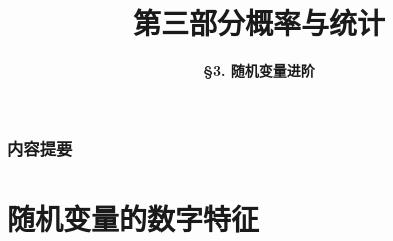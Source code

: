 



\title[Probability \& Statistics]{\LARGE \bfseries 第三部分\quad 概率与统计} %
\author[More on Random Variables] %
{\Large \bfseries \S 3. 随机变量进阶}
\date{}






\begin{frame}

\titlepage %

\end{frame}


\begin{frame}
\frametitle{内容提要} %
\tableofcontents %
\end{frame}



\section{随机变量的数字特征}



